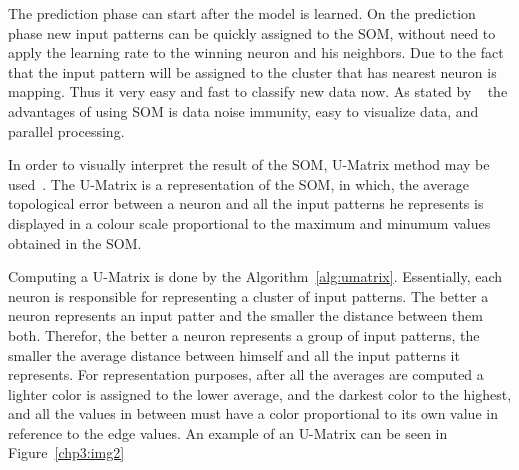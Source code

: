 The prediction phase can start after the model is learned. On the prediction phase new input patterns can be quickly assigned to the \ac{SOM}, without need to apply the learning rate to the winning neuron and his neighbors. Due to the fact that the input pattern will be assigned to the cluster that has nearest neuron is mapping. Thus it very easy and fast to classify new data now. As stated by ~\citet{Liu2012b} the advantages of using \ac{SOM} is data noise immunity, easy to visualize data, and parallel processing.

In order to visually interpret the result of the \ac{SOM}, \ac{U-Matrix} method may be used~\citep{Bacao2005}. The \ac{U-Matrix} is a representation of the \ac{SOM}, in which, the average topological error between a neuron and all the input patterns he represents is displayed in a colour scale proportional to the maximum and minumum values obtained in the \ac{SOM}. 

Computing a U-Matrix is done by the Algorithm~\ref{alg:umatrix}. Essentially, each neuron is responsible for representing a cluster of input patterns. The better a neuron represents an input patter and the smaller the distance between them both. Therefor, the better a neuron represents a group of input patterns, the smaller the average distance between himself and all the input patterns it represents. 
For representation purposes, after all the averages are computed a lighter color is assigned to the lower average, and the darkest color to the highest, and all the values in between must have a color proportional to its own value in reference to the edge values. An example of an \ac{U-Matrix} can be seen in Figure~\ref{chp3:img2} 

